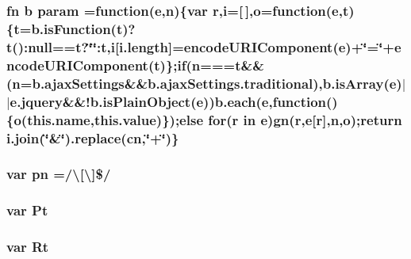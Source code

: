 \hypertarget{jquery-1_89_81_8min_8js_a4c37013f65265b252f7364989773fe8b}{
\subsubsection[{param}]{ {\bf fn} {\bf b} param =function({\bf e},{\bf n})\{var {\bf r},{\bf i}=\mbox{[}$\,$\mbox{]},{\bf o}=function({\bf e},{\bf t})\{{\bf t}=b.\-is\-Function({\bf t})?{\bf t}()\-:null=={\bf t}?\char`\"{}\char`\"{}\-:{\bf t},{\bf i}\mbox{[}i.\-length\mbox{]}=encode\-U\-R\-I\-Component({\bf e})+\char`\"{}=\char`\"{}+encode\-U\-R\-I\-Component({\bf t})\};{\bf if}({\bf n}==={\bf t}\&\&({\bf n}=b.\-ajax\-Settings\&\&b.\-ajax\-Settings.\-traditional),b.\-is\-Array({\bf e})$\vert$$\vert$e.\-jquery\&\&!b.\-is\-Plain\-Object({\bf e})){\bf b.\-each}({\bf e},function()\{{\bf o}(this.\-name,{\bf this.\-value})\});else {\bf for}({\bf r} in {\bf e}){\bf gn}({\bf r},{\bf e}\mbox{[}{\bf r}\mbox{]},{\bf n},{\bf o});return i.\-join(\char`\"{}\&\char`\"{}).replace({\bf cn},\char`\"{}+\char`\"{})\}}}\label{jquery-1_89_81_8min_8js_a4c37013f65265b252f7364989773fe8b}
\hypertarget{jquery-1_89_81_8min_8js_a6a40831f7c967a457dbbd3b5e6f287d7}{
\subsubsection[{pn}]{\setlength{\rightskip}{0pt plus 5cm}var pn =/\textbackslash{}\mbox{[}\textbackslash{}\mbox{]}\$/}}\label{jquery-1_89_81_8min_8js_a6a40831f7c967a457dbbd3b5e6f287d7}
\hypertarget{jquery-1_89_81_8min_8js_a00723d0cb56312f076dd4f2ddf75a7b9}{
\subsubsection[{Pt}]{\setlength{\rightskip}{0pt plus 5cm}var Pt}}\label{jquery-1_89_81_8min_8js_a00723d0cb56312f076dd4f2ddf75a7b9}
\hypertarget{jquery-1_89_81_8min_8js_a27ee00d05d7021e3b587a325f904c420}{
\subsubsection[{Rt}]{\setlength{\rightskip}{0pt plus 5cm}var Rt}}\label{jquery-1_89_81_8min_8js_a27ee00d05d7021e3b587a325f904c420}
